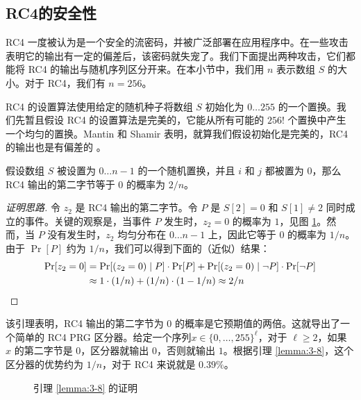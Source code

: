 \subsection{RC4的安全性}


RC4 一度被认为是一个安全的流密码，并被广泛部署在应用程序中。在一些攻击表明它的输出有一定的偏差后，该密码就失宠了。我们下面提出两种攻击，它们都能将 RC4 的输出与随机序列区分开来。在本小节中，我们用 $n$ 表示数组 $S$ 的大小。对于 RC4，我们有 $n=256$。

\begin{snote}[初始 RC4 输出中的偏差。]
RC4 的设置算法使用给定的随机种子将数组 $S$ 初始化为 $0 \dots 255$ 的一个置换。我们先暂且假设 RC4 的设置算法是完美的，它能从所有可能的 $256!$ 个置换中产生一个均匀的置换。Mantin 和 Shamir 表明，就算我们假设初始化是完美的，RC4 的输出也是有偏差的 \cite{mantin2001practical}。
\end{snote}

\begin{lemma}\label{lemma:3-8}
假设数组 $S$ 被设置为 $0\dots n-1$ 的一个随机置换，并且 $i$ 和 $j$ 都被置为 $0$，那么 RC4 输出的第二字节等于 $0$ 的概率为 $2/n$。
\end{lemma}

\begin{proof}[证明思路]
令 $z_2$ 是 RC4 输出的第二字节。令 $P$ 是 $S[2]=0$ 和 $S[1]\neq2$ 同时成立的事件。关键的观察是，当事件 $P$ 发生时，$z_2=0$ 的概率为 $1$，见图 \ref{fig:3-13}。然而，当 $P$ 没有发生时，$z_2$ 均匀分布在 $0\dots n-1$ 上，因此它等于 $0$ 的概率为 $1/n$。由于 $\Pr[P]$ 约为 $1/n$，我们可以得到下面的（近似）结果：
\[
\begin{aligned}
\Pr[z_2=0]
& =\Pr[(z_2=0)\;|\;P]\cdot\Pr[P]+\Pr[(z_2=0)\;|\;\lnot P]\cdot\Pr[\lnot P]\\
& \approx 1\cdot(1/n)+(1/n)\cdot(1-1/n)
\approx 2/n
\qedhere
\end{aligned}
\]
\end{proof}

该引理表明，RC4 输出的第二字节为 $0$ 的概率是它预期值的两倍。这就导出了一个简单的 RC4 PRG 区分器。给定一个序列$x\in\{0,\dots,255\}^\ell$，对于 $\ell\geq2$，如果 $x$ 的第二字节是 $0$，区分器就输出 $0$，否则就输出 $1$。根据引理 \ref{lemma:3-8}，这个区分器的优势约为 $1/n$，对于 RC4 来说就是 $0.39\%$。

\begin{figure}
	\centering
	
	\caption{引理 \ref{lemma:3-8} 的证明}
	\label{fig:3-13}
\end{figure}

